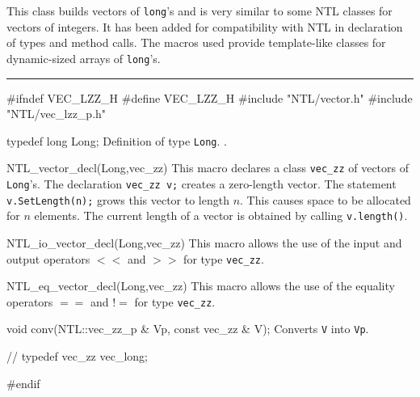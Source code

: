 % 
% 
% 
% 

  
This class builds vectors of \texttt{long}'s and is very similar to some NTL
classes for vectors of integers. It has been added for compatibility with NTL in 
declaration of types and method calls. The macros used provide template-like
classes for dynamic-sized arrays of \texttt{long}'s.



\bigskip\hrule
\code \hide
#ifndef VEC_LZZ_H
#define VEC_LZZ_H
\endhide
#include "NTL/vector.h"
#include "NTL/vec_lzz_p.h"

typedef long Long; 
\endcode
\tab 
   Definition of type \texttt{Long}.
  .
\endtab
\code
          
NTL_vector_decl(Long,vec_zz)
\endcode
 \tab This macro declares a class \texttt{vec\_zz} of vectors of \texttt{Long}'s.
The declaration  \texttt{vec\_zz v;} creates a zero-length vector. The statement
\texttt{v.SetLength(n);} grows this vector to length $n$.
This causes space to be allocated for $n$ elements.
The current length of a vector is obtained by calling \texttt{v.length()}.
\endtab
\code

NTL_io_vector_decl(Long,vec_zz)
\endcode
 \tab This macro allows the use of the input and output operators
 $\scriptstyle{<<}$ and $\scriptstyle{>>}$ for type  \texttt{vec\_zz}.
\endtab
\code

NTL_eq_vector_decl(Long,vec_zz)
\endcode
 \tab This macro allows the use of the equality operators $==$ and $!=$ for type 
  \texttt{vec\_zz}.
\endtab
\code

void conv(NTL::vec_zz_p & Vp, const vec_zz & V);
\endcode
 \tab Converts \texttt{V} into \texttt{Vp}.
\endtab
\code

// typedef vec_zz vec_long; 

\hide
#endif
\endhide
\endcode
